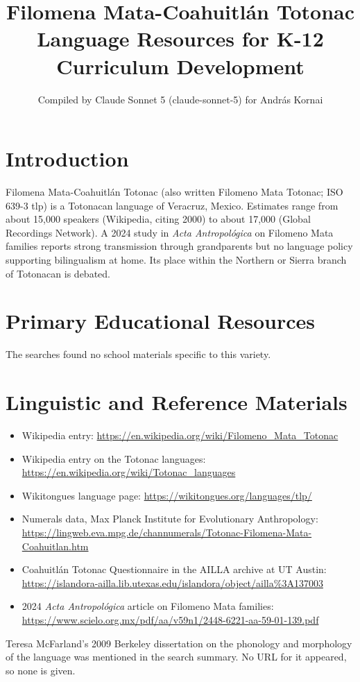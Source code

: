 \documentclass[12pt]{article}
\title{Filomena Mata-Coahuitl\'an Totonac Language Resources for K-12 Curriculum Development}
\author{Compiled by Claude Sonnet 5 (claude-sonnet-5) for Andr\'as Kornai}
\date{}
\begin{document}
\maketitle

\section{Introduction}
Filomena Mata-Coahuitl\'an Totonac (also written Filomeno Mata Totonac; ISO 639-3 tlp) is a Totonacan language of Veracruz, Mexico. Estimates range from about 15,000 speakers (Wikipedia, citing 2000) to about 17,000 (Global Recordings Network). A 2024 study in \emph{Acta Antropol\'ogica} on Filomeno Mata families reports strong transmission through grandparents but no language policy supporting bilingualism at home. Its place within the Northern or Sierra branch of Totonacan is debated.

\section{Primary Educational Resources}
The searches found no school materials specific to this variety.

\section{Linguistic and Reference Materials}
\begin{itemize}
\item Wikipedia entry: \url{https://en.wikipedia.org/wiki/Filomeno_Mata_Totonac}
\item Wikipedia entry on the Totonac languages: \url{https://en.wikipedia.org/wiki/Totonac_languages}
\item Wikitongues language page: \url{https://wikitongues.org/languages/tlp/}
\item Numerals data, Max Planck Institute for Evolutionary Anthropology: \url{https://lingweb.eva.mpg.de/channumerals/Totonac-Filomena-Mata-Coahuitlan.htm}
\item Coahuitl\'an Totonac Questionnaire in the AILLA archive at UT Austin: \url{https://islandora-ailla.lib.utexas.edu/islandora/object/ailla%3A137003}
\item 2024 \emph{Acta Antropol\'ogica} article on Filomeno Mata families: \url{https://www.scielo.org.mx/pdf/aa/v59n1/2448-6221-aa-59-01-139.pdf}
\end{itemize}
Teresa McFarland's 2009 Berkeley dissertation on the phonology and morphology of the language was mentioned in the search summary. No URL for it appeared, so none is given.
\end{document}
